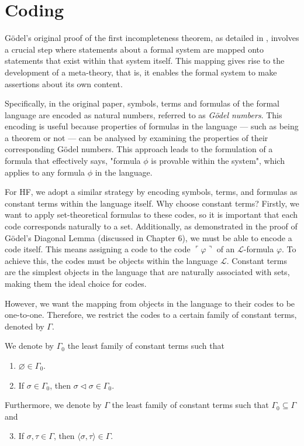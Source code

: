 \chapter{Coding}

Gödel's original proof of the first incompleteness theorem, 
as detailed in \cite{godel1931formal}, 
involves a crucial step where statements about a formal system are mapped onto statements that 
exist within that system itself. 
This mapping gives rise to the development of a meta-theory, that is, 
it enables the formal system to make assertions about its own content.

Specifically, in the original paper, symbols, terms and formulas of the formal language are encoded 
as natural numbers, referred to as \textit{Gödel numbers}. 
This encoding is useful because properties of formulas in the language 
— such as being a theorem or not — 
can be analysed by examining the properties of their corresponding Gödel numbers. 
This approach leads to the formulation of a formula that effectively says, 
"formula $\phi$ is provable within the system", which applies to any formula $\phi$ in the language.

For HF, we adopt a similar strategy by encoding symbols, terms, and formulas 
as constant terms within the language itself. Why choose constant terms?
Firstly, we want to apply set-theoretical formulas to these codes, 
so it is important that each code corresponds naturally to a set. 
Additionally, as demonstrated in the proof of Gödel’s Diagonal Lemma (discussed in Chapter 6), 
we must be able to encode a code itself. 
This means assigning a code to the code $\ulcorner{\varphi}\urcorner$ of an 
$\mathcal{L}$-formula $\varphi$. 
To achieve this, the codes must be objects within the language $\mathcal{L}$. 
Constant terms are the simplest objects in the language that are naturally associated with sets, 
making them the ideal choice for codes.

However, we want the mapping from objects in the language to their codes to be one-to-one.
Therefore, we restrict the codes to a certain family of constant terms, denoted by $\Gamma$.

\begin{definition}
    \label{def:C.IsInΓ0+C.IsInΓ+Code}
    \leanok
    We denote by $\Gamma_0$ the least family of constant terms such that
    \begin{enumerate}
        \item $\varnothing \in \Gamma_0$.
        \item If $\sigma \in \Gamma_0$, then $\sigma \lhd \sigma \in \Gamma_0$.
    \end{enumerate}
    Furthermore, we denote by $\Gamma$ the least family of constant terms such that
    $\Gamma_0 \subseteq \Gamma$ and 
    \begin{enumerate}\setcounter{enumi}{2} %
        \item If $\sigma, \tau \in \Gamma$, then $\langle\sigma, \tau\rangle \in \Gamma$.
    \end{enumerate}
\end{definition}


